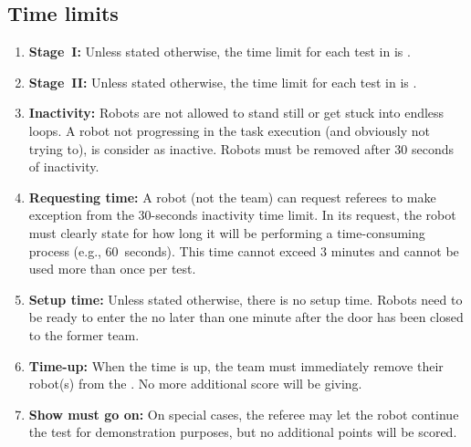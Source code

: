 \subsection{Time limits}
\label{rule:time_limits}
\begin{enumerate}
	\item \textbf{Stage~I:} Unless stated otherwise, the time limit for each test in  is .

	\item \textbf{Stage~II:} Unless stated otherwise, the time limit for each test in  is .

	\item \textbf{Inactivity:} Robots are not allowed to stand still or get stuck into endless loops.
	A robot not progressing in the task execution (and obviously not trying to), is consider as inactive.
	Robots must be removed after 30 seconds of inactivity.

	\item \textbf{Requesting time:} A robot (not the team) can request referees to make exception from the 30-seconds inactivity time limit.
	In its request, the robot must clearly state for how long it will be performing a time-consuming process (e.g., 60~seconds).
	This time cannot exceed 3 minutes and cannot be used more than once per test.

	\item \textbf{Setup time:} Unless stated otherwise, there is no setup time.
	Robots need to be ready to enter the \Arena{} no later than one minute after the door has been closed to the former team.

	\item \textbf{Time-up:} When the time is up, the team must immediately remove their robot(s) from the  \Arena{}.
	No more additional score will be giving.

	\item \textbf{Show must go on:} On special cases, the referee may let the robot continue the test for demonstration purposes, but no additional points will be scored.
\end{enumerate}

